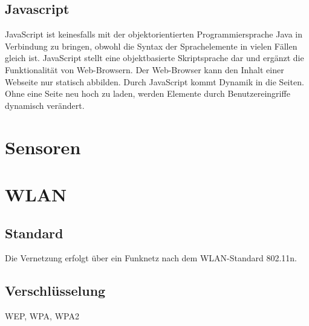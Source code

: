 \subsection{Javascript}
\cite{pomaska2012webseiten-programmierung}
JavaScript ist keinesfalls mit der objektorientierten Programmiersprache Java in
Verbindung zu bringen, obwohl die Syntax der Sprachelemente in vielen Fällen
gleich ist. JavaScript stellt eine objektbasierte Skriptsprache dar und ergänzt die
Funktionalität von Web-Browsern. Der Web-Browser kann den Inhalt einer Webseite
nur statisch abbilden. Durch JavaScript kommt Dynamik in die Seiten. Ohne
eine Seite neu hoch zu laden, werden Elemente durch Benutzereingriffe dynamisch
verändert.

\section{Sensoren}

\section{WLAN}
\subsection{Standard}

Die Vernetzung erfolgt über ein Funknetz nach dem WLAN-Standard 802.11n. 

\subsection{Verschlüsselung}
WEP, WPA, WPA2


